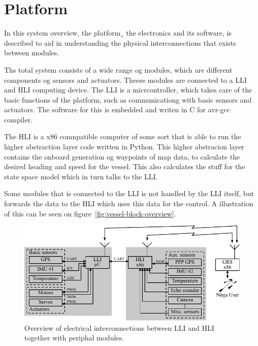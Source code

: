\section{Platform}
\label{sec:platform}
In this system overview, the platform¸ the electronics and its software, is described to aid in understanding the physical interconnections that exists between modules.

Ths total system consists of a wide range og modules, which are different components og sensors and actuators. Theese modules are connected to a \ac{LLI} and \ac{HLI} computing device. The \ac{LLI} is a micrcontroller, which takes care of the basic functions of the platform, such as communicationg with basic sensors and actuators. The software for this is embedded and writen in C for avr-gcc compiler.

The \ac{HLI} is a x86 comnpatible computer of some sort that is able to run the higher abstraction layer code written in Python. This higher abstracion layer contains the onboard generation og waypoints of map data, to calculate the desired heading and speed for the vessel. This also calculates the stuff for the state space model which in turn talks to the \ac{LLI}.

Some modules that is connected to the \ac{LLI} is not handled by the \ac{LLI} itself, but forwards the data to the \ac{HLI} which uses this data for the control. A illustration of this can be seen on figure~\vref{fig:vessel-block-overview}.

\begin{figure}[htbp]
	\centering
	\includegraphics[width=\textwidth]{img/vessel-block-overview-electrical}
	\caption{Overview of electrical interconnections between \ac{LLI} and \ac{HLI} together with periphal modules.}
	\label{fig:vessel-block-overview-electrical}
\end{figure}
